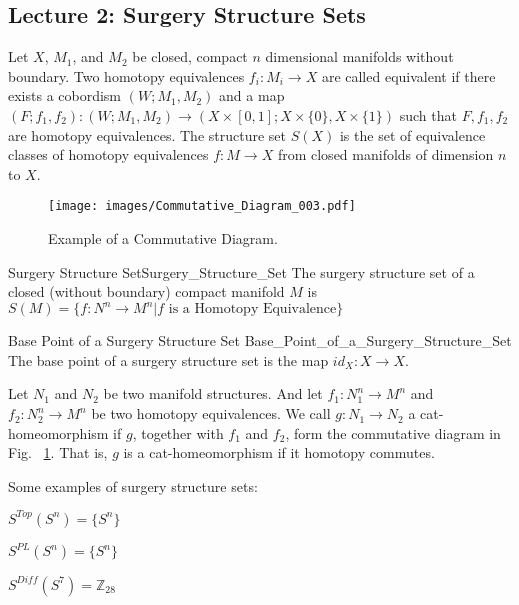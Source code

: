     \subsection{Lecture 2: Surgery Structure Sets}
        Let $X$, $M_{1}$, and $M_{2}$ be closed, compact $n$ dimensional
        manifolds without boundary. Two homotopy equivalences
        $f_{i}:M_{i}\rightarrow X$ are called equivalent if there exists a
        cobordism $(W;M_{1},M_{2})$ and a map
        $(F;f_{1},f_{2}):(W;M_{1},M_{2})%
         \rightarrow(X\times[0,1];X\times\{0\},X\times\{1\})$
        such that $F,f_{1},f_{2}$ are homotopy equivalences. The structure set
        $S(X)$ is the set of equivalence classes of homotopy equivalences
        $f:M\rightarrow X$ from closed manifolds of dimension $n$ to $X$.
        \begin{figure}[H]
            \centering
            \captionsetup{type=figure}
            \texttt{[image: images/Commutative\_Diagram\_003.pdf]}
            \caption{Example of a Commutative Diagram.}
            \label{fig:commutative_diagram_for_g_for_two_homotopy_equivalences}
        \end{figure}
        \begin{ldefinition}{Surgery Structure Set}{Surgery_Structure_Set}
            The surgery structure set of a closed (without boundary) compact
            manifold $M$ is
            $S(M)=\{f:N^{n}\rightarrow{M^{n}}|f%
             \textrm{ is a Homotopy Equivalence}\}$
        \end{ldefinition}
        \begin{ldefinition}{Base Point of a Surgery Structure Set}
                           {Base_Point_of_a_Surgery_Structure_Set}
            The base point of a surgery structure
            set is the map $id_{X}:X\rightarrow X$.
        \end{ldefinition}
        Let $N_{1}$ and $N_{2}$ be two manifold structures.
        And let $f_{1}:N_{1}^{n}\rightarrow M^{n}$ and
        $f_{2}:N_{2}^{n}\rightarrow M^{n}$ be two homotopy
        equivalences. We call $g:N_{1}\rightarrow N_{2}$ a
        cat-homeomorphism if $g$, together with $f_{1}$ and
        $f_{2}$, form the commutative diagram in Fig.~%
        \ref{fig:commutative_diagram_for_g_for_two_homotopy_equivalences}.
        That is, $g$ is a cat-homeomorphism if it
        homotopy commutes.
        \begin{example}
            Some examples of surgery structure sets:
            \begin{enumerate}
                \begin{multicols}{3}
                    \item $S^{Top}(S^{n})=\{S^{n}\}$
                    \item $S^{PL}(S^{n})=\{S^{n}\}$
                    \item $S^{Diff}(S^{7})=\mathbb{Z}_{28}$
                \end{multicols}
            \end{enumerate}
        \end{example}
